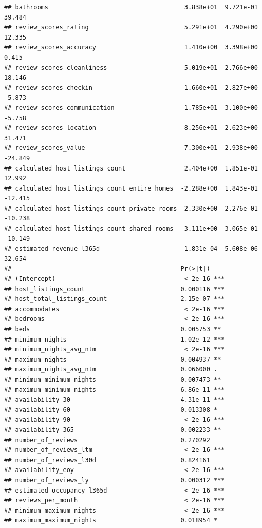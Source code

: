 \documentclass[
]{article}
\begin{document}
\begin{verbatim}
## bathrooms                                     3.838e+01  9.721e-01  39.484
## review_scores_rating                          5.291e+01  4.290e+00  12.335
## review_scores_accuracy                        1.410e+00  3.398e+00   0.415
## review_scores_cleanliness                     5.019e+01  2.766e+00  18.146
## review_scores_checkin                        -1.660e+01  2.827e+00  -5.873
## review_scores_communication                  -1.785e+01  3.100e+00  -5.758
## review_scores_location                        8.256e+01  2.623e+00  31.471
## review_scores_value                          -7.300e+01  2.938e+00 -24.849
## calculated_host_listings_count                2.404e+00  1.851e-01  12.992
## calculated_host_listings_count_entire_homes  -2.288e+00  1.843e-01 -12.415
## calculated_host_listings_count_private_rooms -2.330e+00  2.276e-01 -10.238
## calculated_host_listings_count_shared_rooms  -3.111e+00  3.065e-01 -10.149
## estimated_revenue_l365d                       1.831e-04  5.608e-06  32.654
##                                              Pr(>|t|)    
## (Intercept)                                   < 2e-16 ***
## host_listings_count                          0.000116 ***
## host_total_listings_count                    2.15e-07 ***
## accommodates                                  < 2e-16 ***
## bedrooms                                      < 2e-16 ***
## beds                                         0.005753 ** 
## minimum_nights                               1.02e-12 ***
## minimum_nights_avg_ntm                        < 2e-16 ***
## maximum_nights                               0.004937 ** 
## maximum_nights_avg_ntm                       0.066000 .  
## minimum_minimum_nights                       0.007473 ** 
## maximum_minimum_nights                       6.86e-11 ***
## availability_30                              4.31e-11 ***
## availability_60                              0.013308 *  
## availability_90                               < 2e-16 ***
## availability_365                             0.002233 ** 
## number_of_reviews                            0.270292    
## number_of_reviews_ltm                         < 2e-16 ***
## number_of_reviews_l30d                       0.824161    
## availability_eoy                              < 2e-16 ***
## number_of_reviews_ly                         0.000312 ***
## estimated_occupancy_l365d                     < 2e-16 ***
## reviews_per_month                             < 2e-16 ***
## minimum_maximum_nights                        < 2e-16 ***
## maximum_maximum_nights                       0.018954 *  

\end{verbatim}
\end{document}
